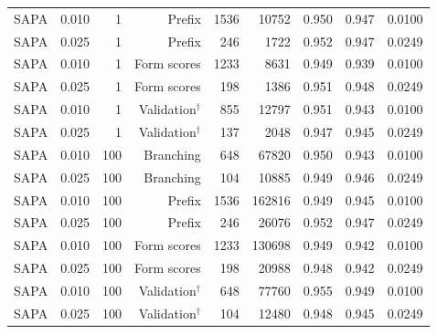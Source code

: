 \begin{table}[t]
\begin{tabular}{lrrrrrrrr}
SAPA & 0.010 & 1 & Prefix & 1536 & 10752 & 0.950 & 0.947 & 0.0100 \\
SAPA & 0.025 & 1 & Prefix & 246 & 1722 & 0.952 & 0.947 & 0.0249 \\
SAPA & 0.010 & 1 & Form scores & 1233 & 8631 & 0.949 & 0.939 & 0.0100 \\
SAPA & 0.025 & 1 & Form scores & 198 & 1386 & 0.951 & 0.948 & 0.0249 \\
SAPA & 0.010 & 1 & Validation$^\dagger$ & 855 & 12797 & 0.951 & 0.943 & 0.0100 \\
SAPA & 0.025 & 1 & Validation$^\dagger$ & 137 & 2048 & 0.947 & 0.945 & 0.0249 \\
SAPA & 0.010 & 100 & Branching & 648 & 67820 & 0.950 & 0.943 & 0.0100 \\
SAPA & 0.025 & 100 & Branching & 104 & 10885 & 0.949 & 0.946 & 0.0249 \\
SAPA & 0.010 & 100 & Prefix & 1536 & 162816 & 0.949 & 0.945 & 0.0100 \\
SAPA & 0.025 & 100 & Prefix & 246 & 26076 & 0.952 & 0.947 & 0.0249 \\
SAPA & 0.010 & 100 & Form scores & 1233 & 130698 & 0.949 & 0.942 & 0.0100 \\
SAPA & 0.025 & 100 & Form scores & 198 & 20988 & 0.948 & 0.942 & 0.0249 \\
SAPA & 0.010 & 100 & Validation$^\dagger$ & 648 & 77760 & 0.955 & 0.949 & 0.0100 \\
SAPA & 0.025 & 100 & Validation$^\dagger$ & 104 & 12480 & 0.948 & 0.945 & 0.0249 \\
\bottomrule
\end{tabular}
\end{table}
